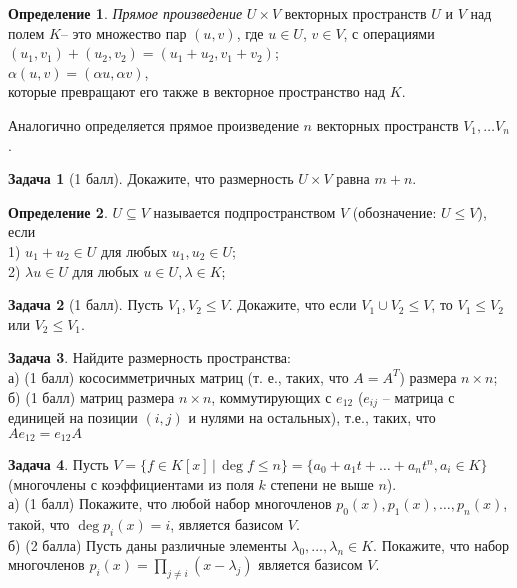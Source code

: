 \documentclass[12pt, fleqn]{extarticle}
\theoremstyle{definition}
\newtheorem{definition}{Определение}
\newtheorem{problem}{Задача}
\theoremstyle{remark}
\begin{document}
\begin{definition}
{\it Прямое произведение} $U \times V$ векторных пространств $U$ и $V$ над полем $K$-- это множество пар
$(u, v)$, где $u \in U$, $v \in V$, с операциями\\
$(u_1, v_1) + (u_2, v_2) = (u_1 + u_2, v_1 + v_2)$;\\
$\alpha (u, v) = (\alpha u, \alpha v)$,\\
которые превращают его также в векторное пространство над $K$.

Аналогично определяется прямое произведение $n$ векторных пространств $V_1, \ldots V_n$.
\end{definition}

\begin{problem}[1 балл]
Докажите, что размерность $U \times V$ равна $m + n$. 
\end{problem}

\begin{definition}
$U \subseteq V$ называется подпространством $V$ (обозначение: $U \leqslant V$), если\\
1) $u_{1} + u_{2} \in U$ для любых $u_{1}, u_{2} \in U$;\\
2) $\lambda u \in U$ для любых $u \in U, \lambda \in K$;
\end{definition}


\begin{problem}[1 балл]
Пусть $V_1,V_2\leq V$. 
Докажите, что если $V_1\cup V_2\leq V$, то $V_1\leq V_2$ или $V_2\leq V_1$.
\end{problem}


\begin{problem}
Найдите размерность пространства:\\
а) (1 балл) кососимметричных матриц (т. е., таких, что $A = A^{T}$) размера $n\times n$;\\
б) (1 балл) матриц размера $n\times n$, коммутирующих с $e_{12}$ 
($e_{ij}$ -- матрица с единицей на позиции $(i, j)$ и нулями на остальных),
т.е., таких, что $Ae_{12} = e_{12}A$
\end{problem}

\begin{problem}
Пусть $V=\{f\in K[x]\,|\, \deg f\leq n\} = \{a_{0} + a_{1}t + \ldots + a_{n}t^{n}, a_{i} \in K\}$
(многочлены с коэффициентами из поля  $k$ степени не выше $n$). \\
а) (1 балл) Покажите, что любой набор многочленов $p_0(x), p_1(x), \dots, p_n(x)$, 
такой, что $\deg p_i(x)=i$, является базисом $V$.\\
б) (2 балла) Пусть даны различные элементы $\lambda_0, \dots, \lambda_n\in K$. 
Покажите, что набор многочленов $p_i(x)=\prod_{j\neq i}(x-\lambda_j)$ является базисом $V$.
\end{problem}
\end{document}

